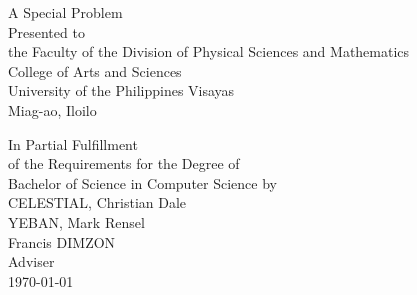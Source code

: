 \begin{titlepage}
\centering


\vspace{1.75cm}
A Special Problem\\
Presented to\\
the Faculty of the Division of Physical Sciences and Mathematics\\
College of Arts and Sciences\\
University of the Philippines Visayas\\
Miag-ao, Iloilo

\vspace{1.75cm}
In Partial Fulfillment\\
of the Requirements for the Degree of\\
Bachelor of Science in Computer Science
\vspace{1.75cm}
by\\

\vspace{1cm}
CELESTIAL, Christian Dale \\
YEBAN, Mark Rensel  \\

\vspace{1.75cm}
Francis DIMZON \\
Adviser\\

\vspace{1.75cm}
\today
\end{titlepage}
